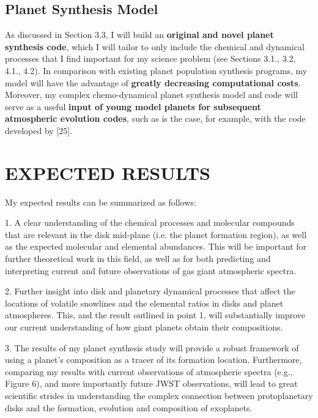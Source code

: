 \documentclass[12pt, letterpaper]{article}
\begin{document}
\subsection{Planet Synthesis Model}

As discussed in Section 3.3, I will build an \textbf{original and novel planet synthesis code}, which I will tailor to only include the chemical and dynamical processes that I find important for my science problem (see Sections 3.1., 3.2, 4.1., 4.2). In comparison with existing planet population synthesis programs, my model will have the advantage of \textbf{greatly decreasing computational costs}. Moreover, my complex chemo-dynamical planet synthesis model and code will serve as a useful \textbf{input of young model planets for subsequent atmospheric evolution codes}, such as is the case, for example, with the code developed by [25].  


\section{EXPECTED RESULTS}


My expected results can be summarized as follows:

1. A clear understanding of the chemical processes and molecular compounds that are relevant in the disk mid-plane (i.e. the planet formation region), as well as the expected molecular and elemental abundances. This will be important for further theoretical work in this field, as well as for both predicting and interpreting current and future observations of gas giant atmospheric spectra.

2. Further insight into disk and planetary dynamical processes that affect the locations of volatile snowlines and the elemental ratios in disks and planet atmospheres. This, and the result outlined in point 1, will substantially improve our current understanding of how giant planets obtain their compositions. 

3. The results of my planet synthesis study will provide a robust framework of using a planet's composition as a tracer of its formation location. Furthermore, comparing my results with current observations of atmospheric spectra (e.g., Figure 6), and more importantly future JWST observations, will lead to great scientific strides in understanding the complex connection between protoplanetary disks and the formation, evolution and composition of exoplanets. 
\end{document}
